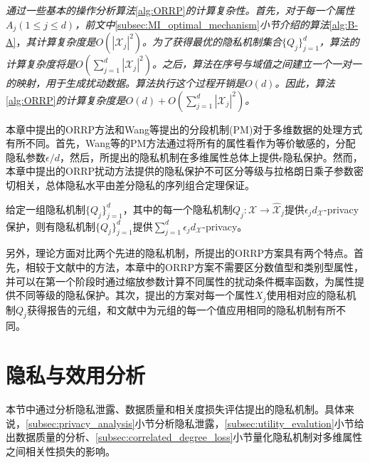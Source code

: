 \begin{remark}{\em
	通过一些基本的操作分析算法}\ref{alg:ORRP}{\em 的计算复杂性。首先，对于每一个属性$A_j(1\leq j \leq d)$，前文中}\ref{subsec:MI_optimal_mechanism}{\em 小节介绍的算法}\ref{alg:B-A}，{\em 其计算复杂度是$O(|\mathcal{X}_j|^2)$。为了获得最优的隐私机制集合$\{Q_j\}_{j=1}^{d}$，算法的计算复杂度将是$O(\sum_{j=1}^{d}|\mathcal{X}_j|^2)$。之后，算法在序号与域值之间建立一个一对一的映射，用于生成扰动数据。算法执行这个过程开销是$O(d)$。因此，算法}\ref{alg:ORRP}{\em 的计算复杂度是$O(d)+O(\sum_{j=1}^{d}|\mathcal{X}_j|^2)$。}
\end{remark}

本章中提出的ORRP方法和Wang等\cite{wang2019collecting}提出的分段机制(PM)对于多维数据的处理方式有所不同。首先，Wang等的PM方法通过将所有的属性看作为等价敏感的，分配隐私参数$\epsilon/d$，然后，所提出的隐私机制在多维属性总体上提供$\epsilon$隐私保护。然而，本章中提出的ORRP扰动方法提供的隐私保护不可区分等级与拉格朗日乘子参数密切相关，总体隐私水平由差分隐私的序列组合定理\cite{dwork2014algorithmic,mcsherry2007mechanism}保证。


\begin{theorem}\label{theorem:chapter06_sequence}
给定一组隐私机制$\{Q_j\}_{j=1}^{d}$，其中的每一个隐私机制$Q_j:\mathcal{X}\rightarrow\hat{\mathcal{X}}_j$提供$\epsilon_j d_{\mathcal{X}}$-privacy保护，则有隐私机制$\{Q_j\}_{j=1}^{d}$提供$\sum _{j=1}^{d} \epsilon_j d_{\mathcal{X}}$-privacy。
\end{theorem}

另外，理论方面对比两个先进的隐私机制，所提出的ORRP方案具有两个特点。首先，相较于文献中的方法，本章中的ORRP方案不需要区分数值型和类别型属性，并可以在第一个阶段时通过缩放参数计算不同属性的扰动条件概率函数，为属性提供不同等级的隐私保护。其次，提出的方案对每一个属性$X_j$使用相对应的隐私机制$Q_j$获得报告的元组，和文献中为元组的每一个值应用相同的隐私机制有所不同。

\section{隐私与效用分析}\label{sec:chapter06_privacy_utility_analysis}

本节中通过分析隐私泄露、数据质量和相关度损失评估提出的隐私机制。具体来说，\ref{subsec:privacy_analysis}小节分析隐私泄露，\ref{subsec:utility_evalution}小节给出数据质量的分析、\ref{subsec:correlated_degree_loss}小节量化隐私机制对多维属性之间相关性损失的影响。

